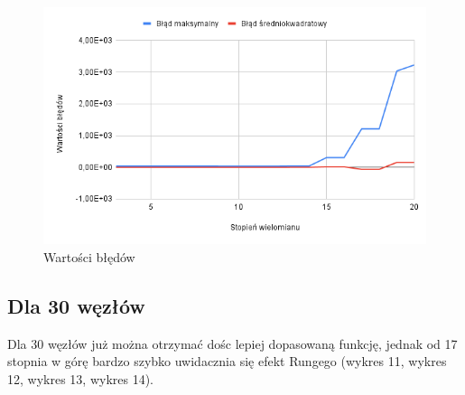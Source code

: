 \documentclass{article}
\begin{document}
\begin{figure}[H]
  \centering
  \begin{minipage}[b]{0.4\textwidth}
    \includegraphics[width=\textwidth]{img15.png}
    \caption{Wartości błędów}
  \end{minipage}
\end{figure}

\newpage

\subsection{Dla 30 węzłów}

Dla 30 węzłów już można otrzymać dośc lepiej dopasowaną funkcję, jednak od 17 stopnia w górę bardzo szybko uwidacznia się efekt Rungego (wykres 11, wykres 12, wykres 13, wykres 14).
\end{document}

